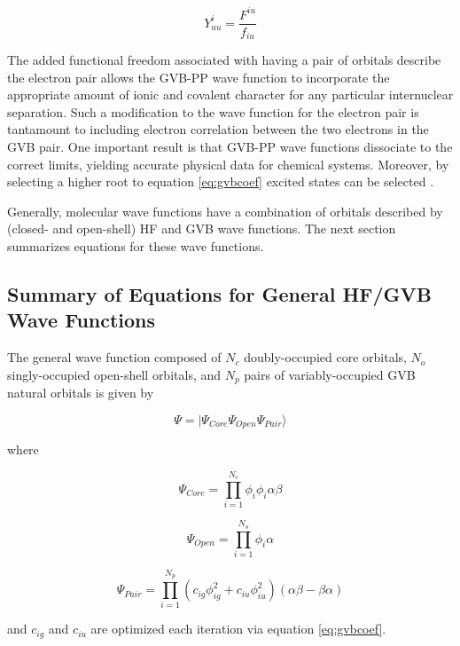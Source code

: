 \begin{equation}
  Y^i_{uu} = \frac{F^{iu}}{f_{iu}}
\end{equation}

\noindent The added functional freedom associated with having a pair
of orbitals describe the electron pair allows the GVB-PP wave function
to incorporate the appropriate amount of ionic and covalent character
for any particular internuclear separation. Such a modification to the
wave function for the electron pair is tantamount to including
electron correlation between the two electrons in the GVB pair. One
important result is that GVB-PP wave functions dissociate to the
correct limits, yielding accurate physical data for chemical systems.
Moreover, by selecting a higher root to equation \ref{eq:gvbcoef}
excited states can be selected \cite{Foresman92}.

Generally, molecular wave functions have a combination of orbitals
described by (closed- and open-shell) HF and GVB wave functions. The
next section summarizes equations for these wave functions.

\subsection{Summary of Equations for General HF/GVB Wave Functions}
\label{sec2.7}
The general wave function composed of $N_c$ doubly-occupied core
orbitals, $N_o$ singly-occupied open-shell orbitals, and $N_p$ pairs
of variably-occupied GVB natural orbitals is given by

\begin{equation}
	\Psi = |\Psi_{Core}\Psi_{Open}\Psi_{Pair}\rangle
\label{eq:wfngen2.7}
\end{equation}

\noindent where

\begin{equation}
	\Psi_{Core} = \prod_{i=1}^{N_c} \phi_i\phi_i\alpha\beta
\end{equation}

\begin{equation}
	\Psi_{Open} = \prod_{i=1}^{N_o} \phi_i\alpha
\end{equation}

\begin{equation}
	\Psi_{Pair} = \prod_{i=1}^{N_p} (c_{ig}\phi_{ig}^2
		+ c_{iu}\phi_{iu}^2)(\alpha\beta-\beta\alpha)
\end{equation}

\noindent and $c_{ig}$ and $c_{iu}$ are optimized each iteration via
equation \ref{eq:gvbcoef}.

